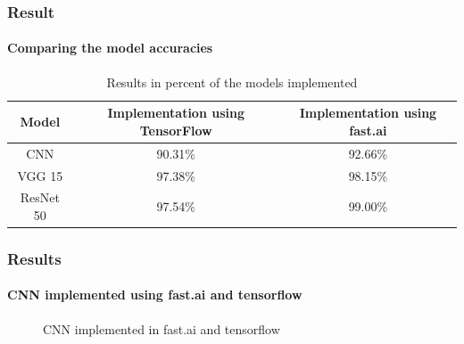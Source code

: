 \documentclass[10pt, aspectratio=169]{beamer}
\begin{document}
	\begin{frame}
		\frametitle{Result}
		\framesubtitle{Comparing the model accuracies}

		\begin{table}
			\begin{center}
				\begin{tabular}{| c | c | c |}
					\hline
					Model & Implementation using TensorFlow & Implementation using
					fast.ai \\
					\hline
					CNN & 90.31\% & 92.66\% \\
					\hline
					VGG 15 & 97.38\% & 98.15\% \\
					\hline
					ResNet 50 & 97.54\% & 99.00\% \\
					\hline
				\end{tabular}
				\caption{Results in percent of the models implemented}
			\end{center}
	\end{table}
	\end{frame}

	\begin{frame}
		\frametitle{Results}
		\framesubtitle{CNN implemented using fast.ai and tensorflow}
		\begin{figure}[H]
			\centering
			\hspace{0.5cm}
			\caption{CNN implemented in fast.ai and tensorflow}
			\label{CNN in fast.ai and tensorflow}
		\end{figure}
	\end{frame}
\end{document}
